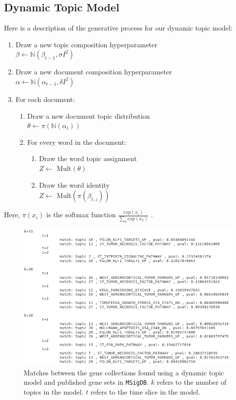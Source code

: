 \documentclass{article}
\begin{document}
\subsection{Dynamic Topic Model}
\label{dtmappendix}
Here is a description of the generative process for our dynamic topic model:
\begin{enumerate}
    \item Draw a new topic composition hyperparameter \\ $\beta \leftarrow \mathbb{N}(\beta_{t-1}, \sigma I^2)$
    \item Draw a new document composition hyperparameter \\ $\alpha \leftarrow \mathbb{N}(\alpha_{t-1}, \delta I^2)$
    \item For each document: 
    \begin{enumerate}
        \item Draw a new document topic distribution \\ $\theta \leftarrow \pi(\mathbb{N}(\alpha_t))$
        \item For every word in the document:
        \begin{enumerate}
            \item Draw the word topic assignment \\ $Z \leftarrow$ Mult$(\theta)$
            \item Draw the word identity \\ $Z \leftarrow$ Mult$(\pi(\beta_{t,z}))$
        \end{enumerate}
    \end{enumerate}
\end{enumerate}
Here, $\pi(x_i)$ is the softmax function $\frac{exp(x_i)}{\sum_k exp(x_k)}$ \cite{dtm}.

\begin{figure}
    \centering
    \includegraphics[width=1\textwidth]{figs/pathwaysdtm}
    \caption{Matches between the gene collections found using a dynamic topic model and published gene sets in \texttt{MSigDB}. $k$ refers to the number of topics in the model. $t$ refers to the time slice in the model.}
    \label{fig:pathwaysdtm}
\end{figure}
\end{document}
